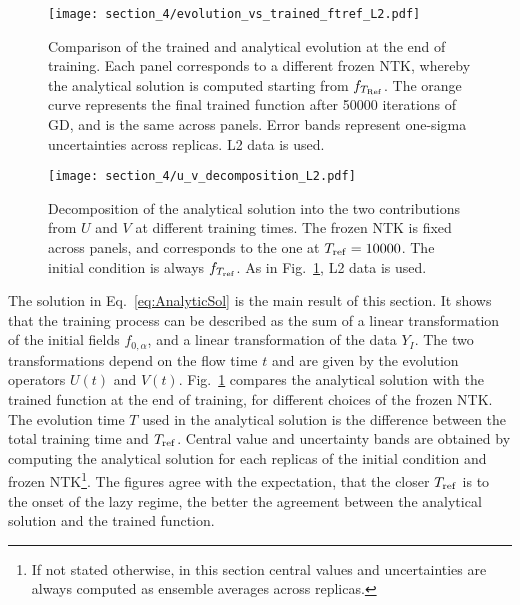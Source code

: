 \begin{figure}[t]
  \centering
  \texttt{[image: section\_4/evolution\_vs\_trained\_ftref\_L2.pdf]} 
  \caption{Comparison of the trained and analytical evolution at the end of
  training. Each panel corresponds to a different frozen NTK, whereby the
  analytical solution is computed starting from $f_{T_{\rm Ref}}$. The orange
  curve represents the final trained function after 50000 iterations of GD, and
  is the same across panels. Error bands represent one-sigma uncertainties
  across replicas. L2 data is used.}
  \label{fig:OnsetLazyL2}
\end{figure}
\begin{figure}[t]
  \centering
  \texttt{[image: section\_4/u\_v\_decomposition\_L2.pdf]} 
  \caption{Decomposition of the analytical solution into the two contributions
  from $U$ and $V$ at different training times. The frozen NTK is fixed across
  panels, and corresponds to the one at $T_{\rm ref} = 10000$. The initial
  condition is always $f_{T_{\rm ref}}$. As in Fig.~\ref{fig:OnsetLazyL2}, L2 data
  is used.}
  \label{fig:FrefDecompositionL2}
\end{figure}

The solution in Eq.~\eqref{eq:AnalyticSol} is the main result of this section.
It shows that the training process can be described as the sum of a linear
transformation of the initial fields $f_{0,\alpha}$, and a linear transformation
of the data $Y_I$. The two transformations depend on the flow time $t$ and are
given by the evolution operators $U(t)$ and $V(t)$. Fig.~\ref{fig:OnsetLazyL2}
compares the analytical solution with the trained function at the end of
training, for different choices of the frozen NTK. The evolution time $T$ used
in the analytical solution is the difference between the total training time and
$T_{\rm ref}$. Central value and uncertainty bands are obtained by computing the
analytical solution for each replicas of the initial condition and frozen NTK\footnote{
  If not stated otherwise, in this section central values and uncertainties are
  always computed as ensemble averages across replicas.
}.
The figures agree with the expectation, that the closer $T_{\rm ref}$ is to the
onset of the lazy regime, the better the agreement between the analytical
solution and the trained function.

